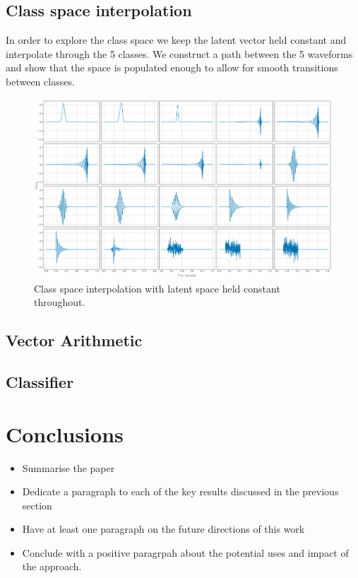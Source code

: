 \documentclass[12pt]{iopart}
\begin{document}
\subsection{Class space interpolation}
In order to explore the class space we keep the latent vector held constant and interpolate through the 5 classes. We construct a path between the 5 waveforms and show that the space is populated enough to allow for smooth transitions between classes. 
\begin{figure}
    \centering
    \includegraphics[width=\textwidth]{figures/fixed_z_slerp.png}
    \caption{Class space interpolation with latent space held constant throughout.}
    \label{fig:c_interp}
\end{figure}

\subsection{Vector Arithmetic}
\subsection{Classifier}


\section{Conclusions}

\begin{itemize}
\item Summarise the paper
\item Dedicate a paragraph to each of the key results discussed in the previous
section
\item Have at least one paragraph on the future directions of this work
\item Conclude with a positive paragrpah about the potential uses and impact of
the approach.
\end{itemize}
\end{document}
